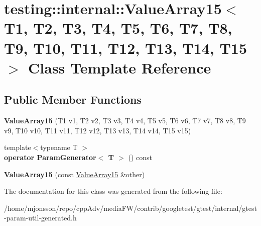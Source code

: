 \hypertarget{classtesting_1_1internal_1_1ValueArray15}{}\section{testing\+:\+:internal\+:\+:Value\+Array15$<$ T1, T2, T3, T4, T5, T6, T7, T8, T9, T10, T11, T12, T13, T14, T15 $>$ Class Template Reference}
\label{classtesting_1_1internal_1_1ValueArray15}
\subsection*{Public Member Functions}
\begin{DoxyCompactItemize}
\item 
\mbox{\label{classtesting_1_1internal_1_1ValueArray15_a2f9c6670b744cb08587bea1b50e169b4}} 
{\bfseries Value\+Array15} (T1 v1, T2 v2, T3 v3, T4 v4, T5 v5, T6 v6, T7 v7, T8 v8, T9 v9, T10 v10, T11 v11, T12 v12, T13 v13, T14 v14, T15 v15)
\item 
\mbox{\label{classtesting_1_1internal_1_1ValueArray15_ab5a77c335c83ef3f99e3133c2213c495}} 
{\footnotesize template$<$typename T $>$ }\\{\bfseries operator Param\+Generator$<$ T $>$} () const
\item 
\mbox{\label{classtesting_1_1internal_1_1ValueArray15_ab08ee6de70a42bc580229cc32635fa5c}} 
{\bfseries Value\+Array15} (const \hyperlink{classtesting_1_1internal_1_1ValueArray15}{Value\+Array15} \&other)
\end{DoxyCompactItemize}


The documentation for this class was generated from the following file\+:\begin{DoxyCompactItemize}
\item 
/home/mjonsson/repo/cpp\+Adv/media\+F\+W/contrib/googletest/gtest/internal/gtest-\/param-\/util-\/generated.\+h\end{DoxyCompactItemize}
